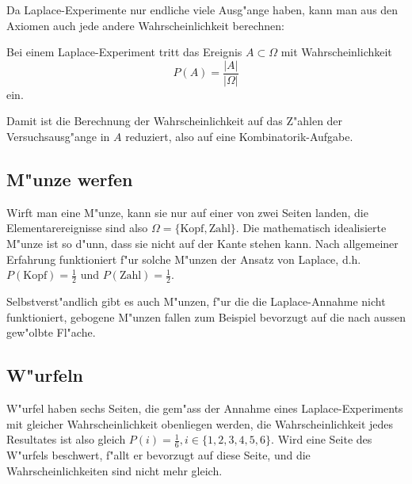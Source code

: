 Da Laplace-Experimente nur endliche viele Ausg"ange haben, kann man aus
den Axiomen auch jede andere Wahrscheinlichkeit berechnen:

\begin{satz}
Bei einem Laplace-Experiment tritt das Ereignis $A\subset\Omega$ mit
Wahrscheinlichkeit
\[
P(A)=\frac{|A|}{|\Omega|}
\]
ein.
\end{satz}
Damit ist die Berechnung der Wahrscheinlichkeit auf das Z"ahlen der 
Versuchsausg"ange in $A$ reduziert, also auf eine Kombinatorik-Aufgabe.

\subsection{M"unze werfen}
Wirft man eine M"unze, kann sie nur auf einer von zwei Seiten landen,
die Elementarereignisse sind also $\Omega = \{\text{Kopf}, \text{Zahl}\}$.
Die mathematisch idealisierte M"unze ist so d"unn, dass sie nicht auf
der Kante stehen kann. Nach allgemeiner Erfahrung funktioniert f"ur
solche M"unzen der Ansatz von Laplace, d.h. $P(\text{Kopf}) = \frac12$
und $P(\text{Zahl})=\frac12$.

Selbstverst"andlich gibt es auch M"unzen, f"ur die die Laplace-Annahme
nicht funktioniert, gebogene M"unzen fallen zum Beispiel bevorzugt auf die
nach aussen gew"olbte Fl"ache.

\subsection{W"urfeln}
W"urfel haben sechs Seiten, die gem"ass der Annahme eines Laplace-Experiments
mit gleicher
Wahrscheinlichkeit obenliegen werden, die Wahrscheinlichkeit jedes
Resultates ist also gleich $P(i) = \frac16, i\in\{1,2,3,4,5,6\}$.
Wird eine Seite des W"urfels beschwert, f"allt er bevorzugt auf diese
Seite, und die Wahrscheinlichkeiten sind nicht mehr gleich.


